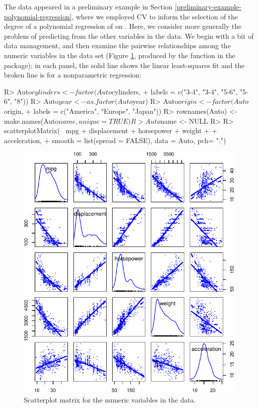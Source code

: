 \documentclass[
]{jss}
\begin{document}
The  data appeared in a preliminary example in Section
\ref{preliminary-example-polynomial-regression}, where we employed CV to
inform the selection of the degree of a polynomial regression of
 on . Here, we consider more generally the
problem of predicting  from the other variables in the
 data. We begin with a bit of data management, and then
examine the pairwise relationships among the numeric variables in the
data set (Figure \ref{fig:Auto-explore-scatterplot-matrix}, produced by
the  function in the  package); in
each panel, the solid line shows the linear least-squares fit and the
broken line is for a nonparametric regression:

\begin{CodeChunk}
\begin{CodeInput}
R> Auto$cylinders <- factor(Auto$cylinders,
+                          labels = c("3-4", "3-4", "5-6", "5-6", "8"))
R> Auto$year <- as.factor(Auto$year)
R> Auto$origin <- factor(Auto$origin,
+                       labels = c("America", "Europe", "Japan"))
R> rownames(Auto) <- make.names(Auto$name, unique = TRUE)
R> Auto$name <- NULL
R>
R> scatterplotMatrix(~ mpg + displacement + horsepower + weight
+                   + acceleration,
+                   smooth = list(spread = FALSE), data = Auto, pch= ".")
\end{CodeInput}
\begin{figure}

{\centering \includegraphics[width=0.95\linewidth]{Figures/Auto-explore-scatterplot-matrix-1}

}

\caption[Scatterplot matrix for the numeric variables in the  data]{Scatterplot matrix for the numeric variables in the  data.}\label{fig:Auto-explore-scatterplot-matrix}
\end{figure}
\end{CodeChunk}
\end{document}
